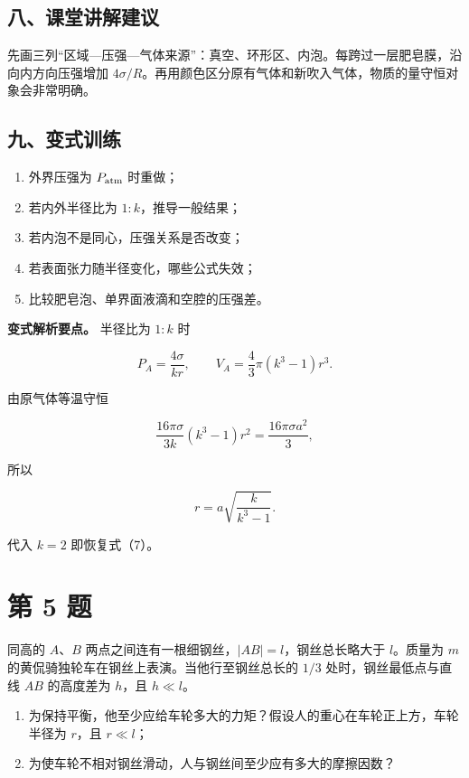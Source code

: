 \documentclass[12pt,a4paper,UTF8]{ctexart}
\newcommand{\tightlist}{\setlength{\itemsep}{0pt}\setlength{\parskip}{0pt}}
\begin{document}
\subsection{八、课堂讲解建议}\label{ux516bux8bfeux5802ux8bb2ux89e3ux5efaux8bae-3}

先画三列``区域---压强---气体来源''：真空、环形区、内泡。每跨过一层肥皂膜，沿向内方向压强增加
\(4\sigma/R\)。再用颜色区分原有气体和新吹入气体，物质的量守恒对象会非常明确。

\subsection{九、变式训练}\label{ux4e5dux53d8ux5f0fux8badux7ec3-3}

\begin{enumerate}
\def\labelenumi{\arabic{enumi}.}
\tightlist
\item
  外界压强为 \(P_{\rm atm}\) 时重做；
\item
  若内外半径比为 \(1:k\)，推导一般结果；
\item
  若内泡不是同心，压强关系是否改变；
\item
  若表面张力随半径变化，哪些公式失效；
\item
  比较肥皂泡、单界面液滴和空腔的压强差。
\end{enumerate}

\textbf{变式解析要点。} 半径比为 \(1:k\) 时

\[
P_A=\frac{4\sigma}{kr},
\qquad
V_A=\frac43\pi(k^3-1)r^3.
\]

由原气体等温守恒

\[
\frac{16\pi\sigma}{3k}(k^3-1)r^2
=\frac{16\pi\sigma a^2}{3},
\]

所以

\[
r=a\sqrt{\frac{k}{k^3-1}}.
\]

代入 \(k=2\) 即恢复式（7）。

\newpage

\section{第 5 题}\label{ux7b2c-5-ux9898}

同高的 \(A\)、\(B\) 两点之间连有一根细钢丝，\(|AB|=l\)，钢丝总长略大于
\(l\)。质量为 \(m\) 的黄侃骑独轮车在钢丝上表演。当他行至钢丝总长的
\(1/3\) 处时，钢丝最低点与直线 \(AB\) 的高度差为 \(h\)，且 \(h\ll l\)。

\begin{enumerate}
\def\labelenumi{\arabic{enumi}.}
\tightlist
\item
  为保持平衡，他至少应给车轮多大的力矩？假设人的重心在车轮正上方，车轮半径为
  \(r\)，且 \(r\ll l\)；
\item
  为使车轮不相对钢丝滑动，人与钢丝间至少应有多大的摩擦因数？
\end{enumerate}
\end{document}
